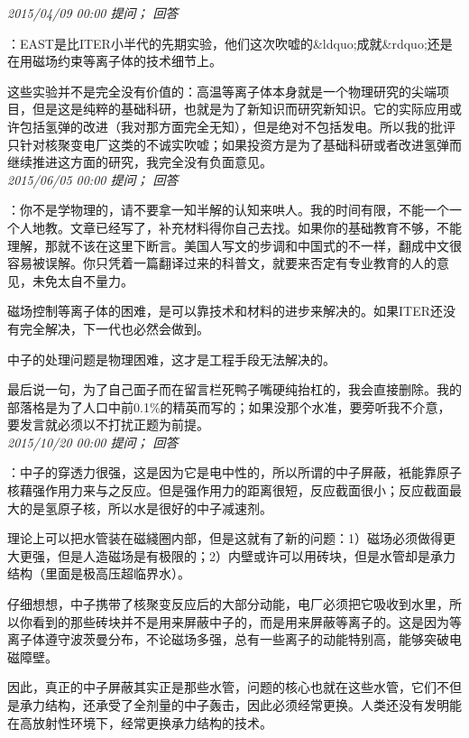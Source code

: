 \documentclass[twocolumn]{ctexart}
\begin{document}
\textit{\hfill\noindent\small 2015/04/09 00:00 提问； 回答}

：EAST是比ITER小半代的先期实验，他们这次吹嘘的\&ldquo;成就\&rdquo;还是在用磁场约束等离子体的技术细节上。

这些实验并不是完全没有价值的：高温等离子体本身就是一个物理研究的尖端项目，但是这是纯粹的基础科研，也就是为了新知识而研究新知识。它的实际应用或许包括氢弹的改进（我对那方面完全无知），但是绝对不包括发电。所以我的批评只针对核聚变电厂这类的不诚实吹嘘；如果投资方是为了基础科研或者改进氢弹而继续推进这方面的研究，我完全没有负面意见。\\

\textit{\hfill\noindent\small 2015/06/05 00:00 提问； 回答}

：你不是学物理的，请不要拿一知半解的认知来哄人。我的时间有限，不能一个一个人地教。文章已经写了，补充材料得你自己去找。如果你的基础教育不够，不能理解，那就不该在这里下断言。美国人写文的步调和中国式的不一样，翻成中文很容易被误解。你只凭着一篇翻译过来的科普文，就要来否定有专业教育的人的意见，未免太自不量力。

磁场控制等离子体的困难，是可以靠技术和材料的进步来解决的。如果ITER还没有完全解决，下一代也必然会做到。

中子的处理问题是物理困难，这才是工程手段无法解决的。

最后说一句，为了自己面子而在留言栏死鸭子嘴硬纯抬杠的，我会直接删除。我的部落格是为了人口中前0.1\%的精英而写的；如果没那个水准，要旁听我不介意，要发言就必须以不打扰正题为前提。\\

\textit{\hfill\noindent\small 2015/10/20 00:00 提问； 回答}

：中子的穿透力很强，这是因为它是电中性的，所以所谓的中子屏蔽，衹能靠原子核藉强作用力来与之反应。但是强作用力的距离很短，反应截面很小；反应截面最大的是氢原子核，所以水是很好的中子减速剂。

理论上可以把水管装在磁綫圈内部，但是这就有了新的问题：1）磁场必须做得更大更强，但是人造磁场是有极限的；2）内壁或许可以用砖块，但是水管却是承力结构（里面是极高压超临界水）。

仔细想想，中子携带了核聚变反应后的大部分动能，电厂必须把它吸收到水里，所以你看到的那些砖块并不是用来屏蔽中子的，而是用来屏蔽等离子的。这是因为等离子体遵守波茨曼分布，不论磁场多强，总有一些离子的动能特别高，能够突破电磁障壁。

因此，真正的中子屏蔽其实正是那些水管，问题的核心也就在这些水管，它们不但是承力结构，还承受了全剂量的中子轰击，因此必须经常更换。人类还没有发明能在高放射性环境下，经常更换承力结构的技术。
\end{document}
